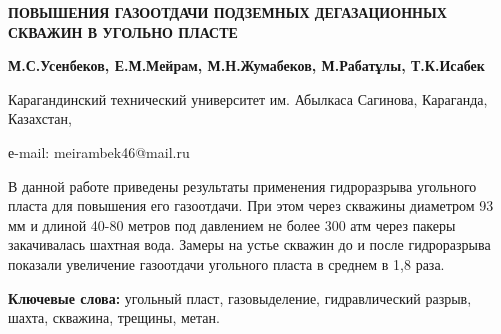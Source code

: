 \begin{center}
{\large\bfseries ПОВЫШЕНИЯ ГАЗООТДАЧИ ПОДЗЕМНЫХ ДЕГАЗАЦИОННЫХ СКВАЖИН В УГОЛЬНО
ПЛАСТЕ}

{\bfseries М.С.Усенбеков\envelope, Е.М.Мейрам, М.Н.Жумабеков,
М.Рабатұлы, Т.К.Исабек}

Карагандинский технический университет им. Абылкаса Сагинова, Караганда,
Казахстан,

е-mail: meirambek46@mail.ru
\end{center}

В данной работе приведены результаты применения гидроразрыва угольного
пласта для повышения его газоотдачи. При этом через скважины диаметром
93 мм и длиной 40-80 метров под давлением не более 300 атм через пакеры
закачивалась шахтная вода. Замеры на устье скважин до и после
гидроразрыва показали увеличение газоотдачи угольного пласта в среднем в
1,8 раза.

{\bfseries Ключевые слова:} угольный пласт, газовыделение, гидравлический
разрыв, шахта, скважина, трещины, метан.

